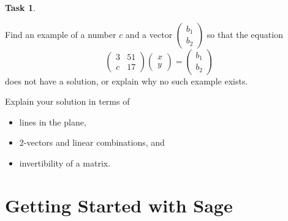 \documentclass[10pt,]{book}
\theoremstyle{plain}
\theoremstyle{definition}
\numberwithin{equation}{section}
\newtheorem{task}{Task}[chapter]
\begin{document}
\begin{task}
\label{task-30}

          Find an example of a number \(c\) and a vector \(\left(
          \begin{smallmatrix} b_1 \\ b_2 \end{smallmatrix}\right)\)
          so that the equation\[
            \begin{pmatrix} 3 & 51 \\ c & 17 \end{pmatrix}
            \begin{pmatrix} x \\ y \end{pmatrix} =
            \begin{pmatrix} b_1 \\ b_2 \end{pmatrix}
          \]
          does not have a solution, or explain why no such example exists.
\par

          Explain your solution in terms of
          \begin{itemize}
\item{}lines in the plane,\item{}\(2\)-vectors and linear combinations, and\item{}invertibility of a matrix.\end{itemize}

\end{task}
\clearpage
\typeout{************************************************}
\typeout{************************************************}
\section[Getting Started with Sage]{Getting Started with Sage}\label{start-sage}
\typeout{************************************************}
\typeout{************************************************}
\end{document}
